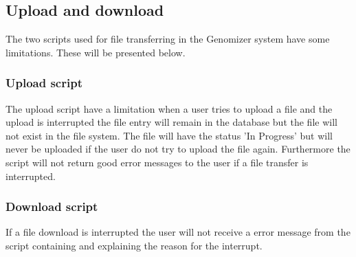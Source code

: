 \subsection{Upload and download}
The two scripts used for file transferring in the Genomizer system have some limitations. These will be presented below.
\subsubsection{Upload script}
The upload script have a limitation when a user tries to upload a file and the upload is interrupted the file entry will remain in the database but the file will not exist in the file system. The file will have the status 'In Progress' but will never be uploaded if the user do not try to upload the file again. Furthermore the script will not return good error messages to the user if a file transfer is interrupted. 
\subsubsection{Download script}
If a file download is interrupted the user will not receive a error message from the script containing and explaining the reason for the interrupt. 

